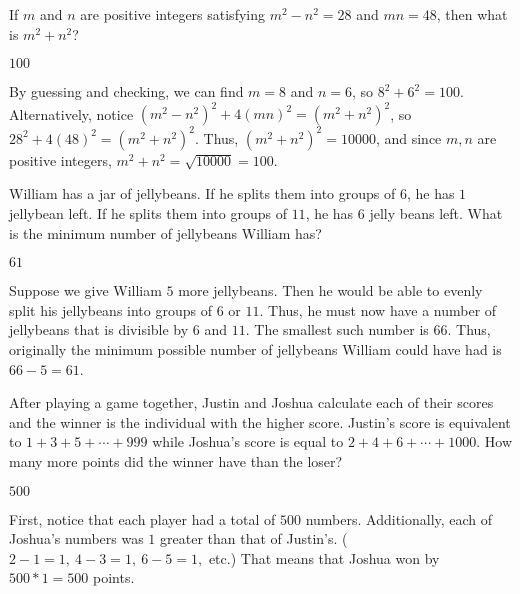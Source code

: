 \documentclass[11pt]{article}
\begin{document}
\begin{problem}
If $m$ and $n$ are positive integers satisfying $m^2-n^2 = 28$ and $mn=48$, then what is $m^2+n^2$?
\end{problem}
\begin{answer}
$100$
\end{answer}
\begin{solution}
By guessing and checking, we can find $m=8$ and $n=6$, so $8^2 + 6^2 = 100$. Alternatively, notice $(m^2 - n^2)^2 + 4(mn)^2 = (m^2 + n^2)^2 $, so $28^2 + 4(48)^2 = (m^2+n^2)^2$. Thus, $(m^2+n^2)^2 = 10000$, and since $m,n$ are positive integers, $m^2+n^2 = \sqrt{10000} = \boxed{100}$.
\end{solution}


\begin{problem}
William has a jar of jellybeans. If he splits them into groups of $6$, he has $1$ jellybean left. If he splits them into groups of $11$, he has $6$ jelly beans left. What is the minimum number of jellybeans William has?
\end{problem}
\begin{answer}
$61$
\end{answer}
\begin{solution}
Suppose we give William $5$ more jellybeans. Then he would be able to evenly split his jellybeans into groups of $6$ or $11$. Thus, he must now have a number of jellybeans that is divisible by $6$ and $11$. The smallest such number is $66$. Thus, originally the minimum possible number of jellybeans William could have had is $66 - 5 = \boxed{61}$.
\end{solution}


\begin{problem}
After playing a game together, Justin and Joshua calculate each of their scores and the winner is the individual with the higher score. Justin's score is equivalent to $1+3+5+\cdots+999$ while Joshua's score is equal to $2+4+6+\cdots+1000$. How many more points did the winner have than the loser? 
\end{problem}

\begin{answer}
$500$
\end{answer}

\begin{solution}
First, notice that each player had a total of $500$ numbers.
Additionally, each of Joshua's numbers was $1$ greater than that of Justin's. ($2 - 1 = 1,\ 4 - 3 = 1,\ 6 - 5 = 1, $ etc.) 
That means that Joshua won by $500*1 = \boxed{500}$ points.
\end{solution}
\end{document}
